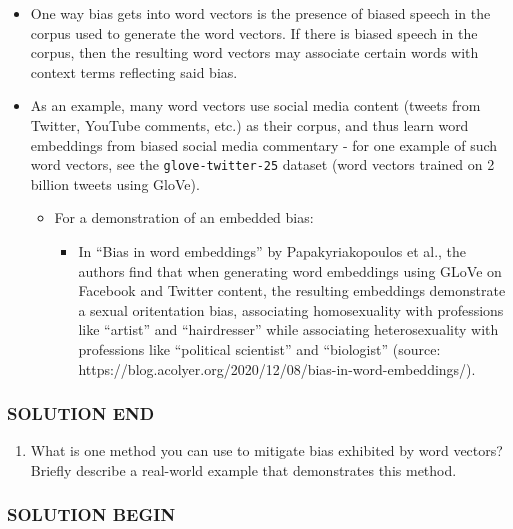 \documentclass[11pt]{article}
\providecommand{\tightlist}{%
      \setlength{\itemsep}{0pt}\setlength{\parskip}{0pt}}
\begin{document}
\begin{itemize}
\item
  One way bias gets into word vectors is the presence of biased speech
  in the corpus used to generate the word vectors. If there is biased
  speech in the corpus, then the resulting word vectors may associate
  certain words with context terms reflecting said bias.
\item
  As an example, many word vectors use social media content (tweets from
  Twitter, YouTube comments, etc.) as their corpus, and thus learn word
  embeddings from biased social media commentary - for one example of
  such word vectors, see the \texttt{glove-twitter-25} dataset (word
  vectors trained on 2 billion tweets using GloVe).

  \begin{itemize}
  \tightlist
  \item
    For a demonstration of an embedded bias:

    \begin{itemize}
    \tightlist
    \item
      In ``Bias in word embeddings'' by Papakyriakopoulos et al., the
      authors find that when generating word embeddings using GLoVe on
      Facebook and Twitter content, the resulting embeddings demonstrate
      a sexual oritentation bias, associating homosexuality with
      professions like ``artist'' and ``hairdresser'' while associating
      heterosexuality with professions like ``political scientist'' and
      ``biologist'' (source:
      https://blog.acolyer.org/2020/12/08/bias-in-word-embeddings/).
    \end{itemize}
  \end{itemize}
\end{itemize}

\hypertarget{solution-end}{%
\subsubsection{SOLUTION END}\label{solution-end}}

    \begin{enumerate}
\def\labelenumi{\alph{enumi}.}
\setcounter{enumi}{1}
\tightlist
\item
  What is one method you can use to mitigate bias exhibited by word
  vectors? Briefly describe a real-world example that demonstrates this
  method.
\end{enumerate}

    \hypertarget{solution-begin}{%
\subsubsection{SOLUTION BEGIN}\label{solution-begin}}
\end{document}
